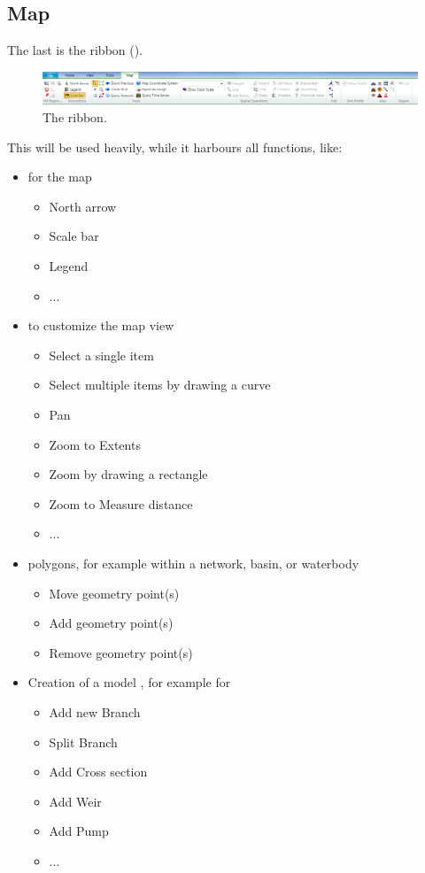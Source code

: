 \subsection{Map}
\label{ssec:ribbonmap}
The last  is the  ribbon ().
\begin{figure}[H]
	\centering
	\includegraphics[width=1.0\textwidth]{figures/chapter_overview/ribbon_map.png}
	\caption{The  ribbon.}
	\label{fig:ribbonmap}
\end{figure}
%
This will be used heavily, while it harbours all  functions, like:
\begin{itemize}
\item {} for the map
\begin{itemize}
	\item North arrow
	\item Scale bar
	\item Legend
	\item ...
\end{itemize}
\item {} to customize the map view
\begin{itemize}
	\item Select a single item
	\item Select multiple items by drawing a curve
	\item Pan
	\item Zoom to Extents
	\item Zoom by drawing a rectangle
	\item Zoom to Measure distance
	\item ...
\end{itemize}
\item {} polygons, for example within a network, basin, or waterbody
\begin{itemize}
	\item Move geometry point(s)
	\item Add geometry point(s)
	\item Remove geometry point(s)
\end{itemize}
\item Creation of a model , for example for \dflow
\begin{itemize}
	\item Add new Branch
	\item Split Branch
	\item Add Cross section
	\item Add Weir
	\item Add Pump
	\item ...
\end{itemize}
\end{itemize}
